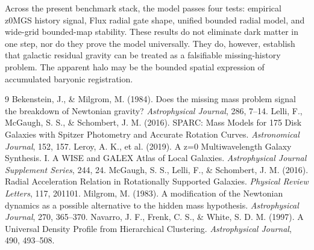 \documentclass[11pt]{article}
\begin{document}
Across the present benchmark stack, the model passes four tests: empirical z0MGS history signal, Flux radial gate shape, unified bounded radial model, and wide-grid bounded-map stability. These results do not eliminate dark matter in one step, nor do they prove the model universally. They do, however, establish that galactic residual gravity can be treated as a falsifiable missing-history problem. The apparent halo may be the bounded spatial expression of accumulated baryonic registration.

\begin{thebibliography}{9}
 Bekenstein, J., \& Milgrom, M. (1984). Does the missing mass problem signal the breakdown of Newtonian gravity? \textit{Astrophysical Journal}, 286, 7--14.
 Lelli, F., McGaugh, S. S., \& Schombert, J. M. (2016). SPARC: Mass Models for 175 Disk Galaxies with Spitzer Photometry and Accurate Rotation Curves. \textit{Astronomical Journal}, 152, 157.
 Leroy, A. K., et al. (2019). A z=0 Multiwavelength Galaxy Synthesis. I. A WISE and GALEX Atlas of Local Galaxies. \textit{Astrophysical Journal Supplement Series}, 244, 24.
 McGaugh, S. S., Lelli, F., \& Schombert, J. M. (2016). Radial Acceleration Relation in Rotationally Supported Galaxies. \textit{Physical Review Letters}, 117, 201101.
 Milgrom, M. (1983). A modification of the Newtonian dynamics as a possible alternative to the hidden mass hypothesis. \textit{Astrophysical Journal}, 270, 365--370.
 Navarro, J. F., Frenk, C. S., \& White, S. D. M. (1997). A Universal Density Profile from Hierarchical Clustering. \textit{Astrophysical Journal}, 490, 493--508.
\end{thebibliography}
\end{document}
